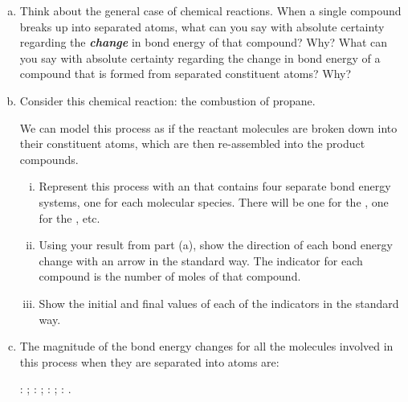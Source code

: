 \label{FNT1.1.4-2}

\begin{enumerate}[(a)]
	\item Think about the general case of chemical reactions. When a single compound breaks up into separated atoms, what can you say with absolute certainty regarding the \textbf{\em change} in bond energy of that compound? Why? What can you say with absolute certainty regarding the change in bond energy of a compound that is formed from separated constituent atoms? Why?
	
	\item Consider this chemical reaction: the combustion of propane.
	\begin{center}
	\end{center}
	We can model this process as if the reactant molecules are broken down into their constituent atoms, which are then re-assembled into the product compounds.

	\begin{enumerate}[i.]
		\item Represent this process with an \EnergyDiagram{} that contains four separate bond energy systems, one for each molecular species. There will be one for the , one for the , etc.
	
		\item Using your result from part (a), show the direction of each bond energy change with an arrow in the standard way. The indicator for each compound is the number of moles of that compound.
		
		\item Show the initial and final values of each of the indicators in the standard way.
	\end{enumerate}
	
	\item The magnitude of the bond energy changes for all the molecules involved in this process when they are separated into atoms are:

	\begin{center}
	: ; \;
	: ; \; 
	: ; \;
	: .
	\end{center}
	

\end{enumerate}
